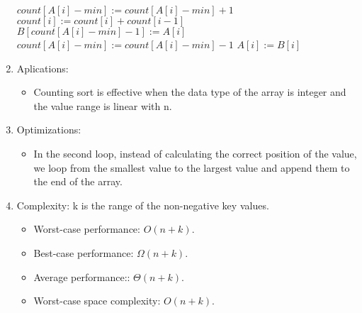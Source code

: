 \documentclass[12pt]{article}
\begin{document}
\begin{enumerate}
        \begin{algorithm}[H]
            \begin{algorithmic}[1]
                        \State $\textit{count}[A[i]-\textit{min}]:=\textit{count}[A[i]-\textit{min}]+1$
                    \EndFor
                        \State $\textit{count}[i]:=\textit{count}[i]+\textit{count}[i-1]$
                    \EndFor
                        \State $B[\textit{count}[A[i]-\textit{min}]-1]:=A[i]$
                        \State $\textit{count}[A[i]-\textit{min}]:=\textit{count}[A[i]-\textit{min}]-1$
                    \EndFor
                        \State $A[i]:=B[i]$
                    \EndFor
                \EndFunction
            \end{algorithmic}
        \end{algorithm}
        \item Aplications:
        \begin{itemize}
            \item Counting sort is effective when the data type of the array is integer and the value range is linear with n.
        \end{itemize}
        \item Optimizations:
        \begin{itemize}
            \item In the second loop, instead of calculating the correct position of the value, we loop from the smallest value to the largest value and append them to the end of the array.
        \end{itemize}
        \item Complexity: k is the range of the non-negative key values.
        \begin{itemize}
            \item Worst-case performance: $O(n+k)$.
            \item Best-case performance: $\Omega(n+k)$.
            \item Average performance:: $\Theta(n+k)$.
            \item Worst-case space complexity: $O(n+k)$.
        \end{itemize}
    \end{enumerate}
    
\end{document}
